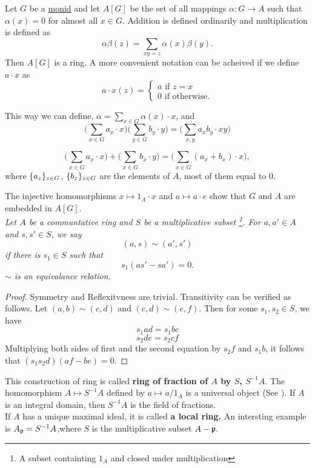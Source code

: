 Let $G$ be a \href{https://en.wikipedia.org/wiki/Monoid}{monid} and let $A[G]$ be the set of all mappings $\alpha: G \to A $ such that $\alpha(x) = 0$ for almost all $x \in G$. Addition is defined ordinarily and multiplication is defined as 
$$\alpha \beta (z) = \sum_{xy = z} \alpha(x) \beta(y).$$
Then $A[G]$ is a ring. A more convenient notation can be acheived if we define $a \cdot x$ as 
$$
    a \cdot x(z) = \begin{cases}
        a \text{ if } z = x\\
        0 \text{ if otherwise.}
\end{cases}$$

This way we can define, 
$\alpha = \sum_{x \in G} \alpha(x) \cdot x$, and 
$$\bigg(\sum_{x \in G} a_x \cdot x \bigg) \bigg(\sum_{y \in G} b_y \cdot y \bigg) = \bigg(\sum_{x, y} a_xb_y \cdot xy \bigg)$$

$$\bigg(\sum_{x \in G} a_x \cdot x \bigg) + \bigg(\sum_{x \in G} b_x \cdot y \bigg) = \bigg(\sum_{x\in G} (a_x + b_x) \cdot x \bigg), $$
where $\{a_z\}_{z \in G}$, $\{b_z\}_{z \in G}$ are the elements of $A$, most of them equal to $0$. 

The injective homomorphisms $x \mapsto 1_A \cdot x$ and $a \mapsto a \cdot e$ show that $G$ and $A$ are embedded in $A[G]$. \\ 


\noindent \textit{Let $A$ be a communtative ring and $S$ be a multiplicative subset \footnote{A subset containting $1_A$ and closed under multiplication}.  For $a, a' \in A$ and $s, s' \in S$, we say}
$$(a, s) \sim (a', s')$$
\textit{if there is $s_1 \in S$ such that}
$$s_1(as' - sa') = 0.$$
\textit{$\sim$ is an equivalance relation.}
\begin{proof}
    Symmetry and Reflexitvness are trivial. Transitivity can be verified as follows. Let $(a, b) \sim (c, d)$ and $(c, d) \sim (e, f)$. Then for some $s_1, s_2 \in S$, we have
    $$s_1ad  = s_1bc$$
    $$s_2de = s_2cf$$
Multiplying both sides of first and the second equation by $s_2f$ and $s_1b$, it follows that $(s_1s_2d)(af - be) = 0.$
\end{proof}
\noindent This construction of ring is called \textbf{ring of fraction of $A$ by $S$, $S^{-1}A$}. The homomorphism $A \mapsto S^{-1}A$ defined by $a \mapsto a/1_A$ is a universal object (See ). If $A$ is an integral domain, then $S^{-1}A$ is the field of fractions.
\\

If $A$ has a unique maximal ideal, it is called \textbf{a local ring.} An intersting example is $A_{\mathfrak{p}} = S^{-1}A$,where $S$ is the multiplicative subset $A - \mathfrak{p}.$